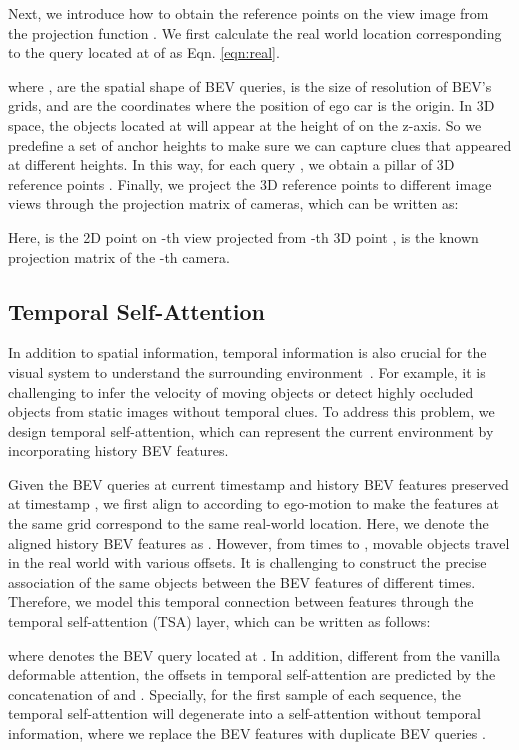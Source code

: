 \documentclass{article}
\begin{document}
Next, we introduce how to obtain the reference points on the view image from the projection  function .
We first calculate the real world location  corresponding to the query  located at  of  as Eqn. \ref{eqn:real}.



where ,  are the spatial shape of BEV queries,  is the size of resolution  of BEV's grids, and  are the coordinates where the position of ego car is the origin. In 3D space, the objects located at  will appear at the height of  on the z-axis. So we predefine a set of anchor heights  to make sure we can capture clues that appeared at different heights.  
In this way, for each query , we obtain a pillar of 3D reference points . Finally, we project the 3D reference points to different image views through the projection  matrix of cameras, which can be written as:

Here,  is the 2D point on -th view projected from -th 3D point ,  is the known projection  matrix of the -th camera. 






\subsection{Temporal Self-Attention}\label{temporal_attention}
In addition to spatial information, temporal information is also crucial for the visual system to understand the surrounding environment~\cite{ma20223d}. 
For example, it is challenging to infer the velocity of moving objects or detect highly occluded objects from static images without temporal clues.
To address this problem, we design temporal self-attention, which can represent the current environment by incorporating history BEV features.



Given the BEV queries  at current timestamp  and history BEV features  preserved at timestamp , we first align  to  according to ego-motion to make the features at the same grid correspond to the same real-world location. 
Here, we denote the aligned history BEV features  as . However, from times  to , movable objects travel in the real world with various offsets. It is challenging to construct the precise association of the same objects between the BEV features of different times. 
Therefore, we model this temporal connection between features through the temporal self-attention (TSA) layer, which can be written as follows:

where  denotes the BEV query located at . In addition, different from the vanilla deformable attention, the offsets  in temporal self-attention are predicted by the concatenation of  and .
Specially, for the first sample of each sequence, the temporal self-attention will degenerate into a self-attention without temporal information, where we replace the BEV features  with duplicate BEV queries . 
\end{document}
